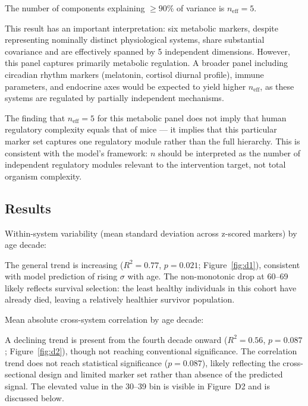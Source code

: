 \documentclass[12pt]{article}
\begin{document}
The number of components explaining $\geq 90\%$ of variance is $n_\text{eff} = 5$.

This result has an important interpretation: six metabolic markers, despite
representing nominally distinct physiological systems, share substantial
covariance and are effectively spanned by 5 independent dimensions. However,
this panel captures primarily metabolic regulation. A broader panel including
circadian rhythm markers (melatonin, cortisol diurnal profile), immune
parameters, and endocrine axes would be expected to yield higher $n_\text{eff}$,
as these systems are regulated by partially independent mechanisms.

The finding that $n_\text{eff} = 5$ for this metabolic panel does not imply
that human regulatory complexity equals that of mice — it implies that this
particular marker set captures one regulatory module rather than the full
hierarchy. This is consistent with the model's framework: $n$ should be
interpreted as the number of independent regulatory modules relevant to the
intervention target, not total organism complexity.

\subsection{Results}

Within-system variability (mean standard deviation across z-scored markers)
by age decade:
\begin{equation}
[25.6,\ 32.8,\ 37.8,\ \mathbf{48.4},\ 30.7,\ 39.6]
\end{equation}

The general trend is increasing ($R^2 = 0.77$, $p = 0.021$; Figure~\ref{fig:d1}),
consistent with model prediction of rising $\sigma$ with age. The non-monotonic
drop at 60--69 likely reflects survival selection: the least healthy individuals
in this cohort have already died, leaving a relatively healthier survivor
population.

Mean absolute cross-system correlation by age decade:
\begin{equation}
[0.159,\ 0.207,\ 0.157,\ 0.110,\ 0.115,\ 0.117]
\end{equation}

A declining trend is present from the fourth decade onward ($R^2 = 0.56$,
$p = 0.087$; Figure~\ref{fig:d2}), though not reaching conventional significance.
The correlation trend does not reach statistical significance ($p = 0.087$),
likely reflecting the cross-sectional design and limited marker set rather than
absence of the predicted signal.
The elevated value in the 30--39 bin is visible in Figure~D2 and is discussed
below.
\end{document}
